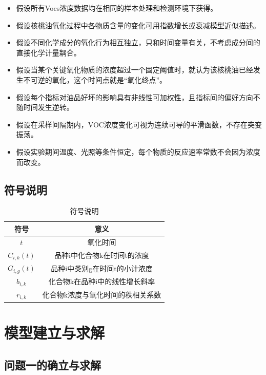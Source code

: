 \documentclass[10pt, a4paper, oneside]{ctexart}
\begin{document}
\begin{itemize}
    \item 假设所有Vocs浓度数据均在相同的样本处理和检测环境下获得。
    \item 假设核桃油氧化过程中各物质含量的变化可用指数增长或衰减模型近似描述。
    \item 假设不同化学成分的氧化行为相互独立，只和时间变量有关，不考虑成分间的直接化学计量耦合。
    \item 假设当某个关键氧化物质的浓度超过一个固定阈值时，就认为该核桃油已经发生不可逆的氧化，这个时间点就是“氧化终点”。
    \item 假设每个指标对油品好坏的影响具有非线性可加权性，且指标间的偏好方向不随时间发生逆转。
    \item 假设在采样间隔期内，VOC浓度变化可视为连续可导的平滑函数，不存在突变振荡。
    \item 假设实验期间温度、光照等条件恒定，每个物质的反应速率常数不会因为浓度而改变。
\end{itemize}

\newpage

\subsection{符号说明}

\begin{table}[htbp]
    \centering
    \caption{符号说明}
    \begin{tabular}[b]{cc}
        \toprule[2pt]
        符号 & 意义 \\
        \midrule
        $t$ & 氧化时间 \\
        $C_{i,k}(t)$ & 品种i中化合物k在时间t的浓度 \\
        $G_{i,g}(t)$ & 品种i中类别g在时间t的小计浓度 \\
        $b_{i,k}$ & 化合物k在品种i中的线性增长斜率 \\
        $r_{i,k}$	& 化合物k浓度与氧化时间的秩相关系数 \\
        \bottomrule[2pt]
    \end{tabular}
\end{table}

\newpage

\section{模型建立与求解}

\subsection{问题一的确立与求解}
\end{document}
